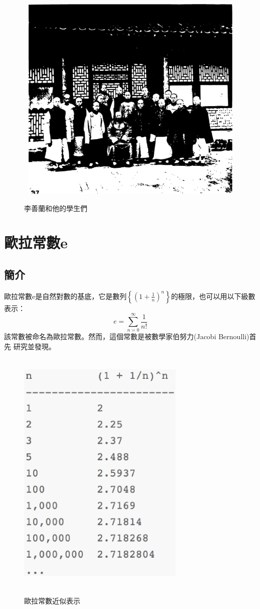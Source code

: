 \documentclass[a4paper, 11pt]{book}
\begin{document}
\begin{figure}[htbp]
    \centering
    \includegraphics[width=12cm, height=10cm]{./Figs/LE-SHEN-LAN_AND_HIS_PUPILS.eps}
    \label{fig:Li_Shanlan_and_his_pupils}
    \caption{李善蘭和他的學生們}
\end{figure}

\chapter*{歐拉常數e}
\section*{簡介}
\indent 歐拉常數e是自然對數的基底，它是數列$\displaystyle \left\{\left(1 + 
\frac{1}{n}\right)^n\right\}$的極限，也可以用以下級數表示：
\[
    e = \sum_{n=0}^{\infty} \frac{1}{n!}
\]
該常數被命名為歐拉常數。然而，這個常數是被數學家伯努力(Jacobi Bernoulli)首先
研究並發現。

\begin{figure}[htbp]
    \centering
    \includegraphics[width=8cm, height=12cm]{./Figs/eulerconstant.eps}
    \label{fig:Euler's constant}
    \caption{歐拉常數近似表示}
\end{figure}
\end{document}

